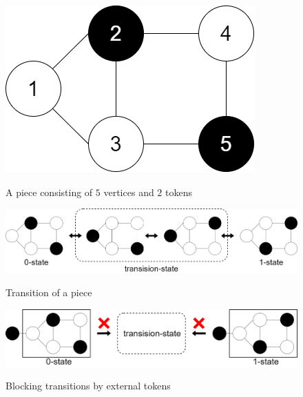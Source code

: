 \documentclass[dvipdfmx,autodetect-engine]{article}
\begin{document}
\begin{figure}[b]
  \begin{center}
    \caption{A piece consisting of $5$ vertices and $2$ tokens}
    \includegraphics[scale=0.3]{part.png}
    \label{lednum}
  \end{center} 
\end{figure}


\begin{figure}[b]
  \begin{center}
    \caption{Transition of a piece}
    \includegraphics[scale=0.2]{transition.png}
    \label{lednum}
  \end{center} 
\end{figure}


\begin{figure}[b]
  \begin{center}
    \caption{Blocking transitions by external tokens}
    \includegraphics[scale=0.2]{blocking.png}
    \label{lednum}
  \end{center} 
\end{figure}
\end{document}
